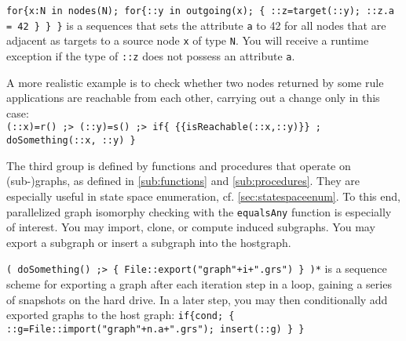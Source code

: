 \begin{example}
\verb#for{x:N in nodes(N); for{::y in outgoing(x); { ::z=target(::y); ::z.a = 42 } } }# 
is a sequences that sets the attribute \texttt{a} to 42 for all nodes that are adjacent as targets to a source node \texttt{x} of type \texttt{N}.
You will receive a runtime exception if the type of \verb#::z# does not possess an attribute \texttt{a}.

A more realistic example is to check whether two nodes returned by some rule applications are reachable from each other, carrying out a change only in this case:\\
\verb#(::x)=r() ;> (::y)=s() ;> if{ {{isReachable(::x,::y)}} ; doSomething(::x, ::y) }#
\end{example}

The third group is defined by functions and procedures that operate on (sub-)graphs, as defined in \ref{sub:functions} and \ref{sub:procedures}.
They are especially useful in state space enumeration, cf. \ref{sec:statespaceenum}.
To this end, parallelized graph isomorphy checking with the \texttt{equalsAny} function is especially of interest.
You may import, clone, or compute induced subgraphs.
You may export a subgraph or insert a subgraph into the hostgraph.

\begin{example}
\verb#( doSomething() ;> { File::export("graph"+i+".grs") } )*# is a sequence scheme for exporting a graph after each iteration step in a loop, gaining a series of snapshots on the hard drive.
In a later step, you may then conditionally add exported graphs to the host graph: 
\verb#if{cond; { ::g=File::import("graph"+n.a+".grs"); insert(::g) } }#
\end{example}

